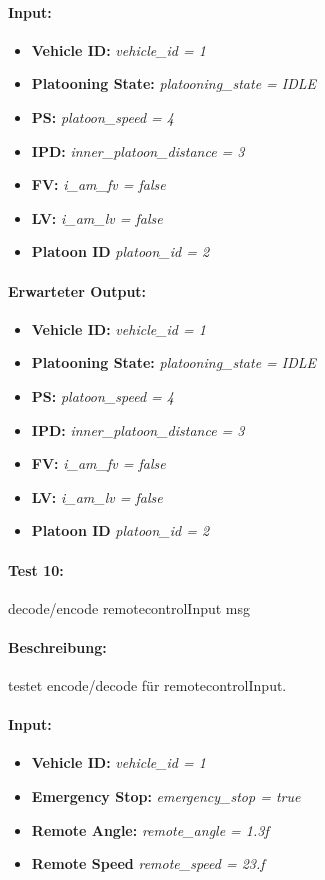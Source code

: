 \documentclass[a4paper, 12pt, titlepage]{scrartcl}
\begin{document}
{			\paragraph{Input:}
			\begin{itemize} \itemsep-0.5em
				\item \textbf{Vehicle ID:} \emph{vehicle\_id = 1}
				\item \textbf{Platooning State:} \emph{platooning\_state = IDLE}
				\item \textbf{PS:} \emph{platoon\_speed = 4}
				\item \textbf{IPD:} \emph{inner\_platoon\_distance = 3}
				\item \textbf{FV:} \emph{i\_am\_fv = false}
				\item \textbf{LV:} \emph{i\_am\_lv = false}
				\item \textbf{Platoon ID} \emph{platoon\_id = 2}
			\end{itemize}
			\paragraph{Erwarteter Output:}
			\begin{itemize} \itemsep-0.5em
				\item \textbf{Vehicle ID:} \emph{vehicle\_id = 1}
				\item \textbf{Platooning State:} \emph{platooning\_state = IDLE}
				\item \textbf{PS:} \emph{platoon\_speed = 4}
				\item \textbf{IPD:} \emph{inner\_platoon\_distance = 3}
				\item \textbf{FV:} \emph{i\_am\_fv = false}
				\item \textbf{LV:} \emph{i\_am\_lv = false}
				\item \textbf{Platoon ID} \emph{platoon\_id = 2}
			\end{itemize}
				
			\paragraph{Test 10:}{decode/encode remotecontrolInput msg}
			\paragraph{Beschreibung:} testet encode/decode für remotecontrolInput.
			\paragraph{Input:}
			\begin{itemize} \itemsep-0.5em
				\item \textbf{Vehicle ID:} \emph{vehicle\_id = 1}
				\item \textbf{Emergency Stop:} \emph{emergency\_stop = true}
				\item \textbf{Remote Angle:} \emph{remote\_angle = 1.3f}
				\item \textbf{Remote Speed} \emph{remote\_speed = 23.f}
			\end{itemize}
}
\end{document}
